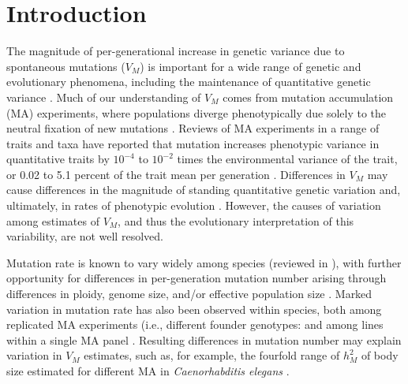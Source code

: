 \section{Introduction}
The magnitude of per-generational increase in genetic variance due to spontaneous mutations ($V_M$) is important for a wide range of genetic and evolutionary phenomena, including the maintenance of quantitative genetic variance \citep{Lync88b, Bart89, John05}. Much of our understanding of $V_M$ comes from mutation accumulation (MA) experiments, where populations diverge phenotypically due solely to the neutral fixation of new mutations \citep{Muka64,Hall09}. Reviews of MA experiments in a range of traits and taxa have reported that mutation increases phenotypic variance in quantitative traits by $10^{-4}$ to $10^{-2}$ times the environmental variance of the trait, or 0.02 to 5.1 percent of the trait mean per generation \citep{Houl96, Lync99, Hall09}. Differences in $V_M$ may cause differences in the magnitude of standing quantitative genetic variation and, ultimately, in rates of phenotypic evolution \citep{Houl98,Lync99,Houl17,Wals18}. However, the causes of variation among estimates of $V_M$, and thus the evolutionary interpretation of this variability, are not well resolved.\par

Mutation rate is known to vary widely among species (reviewed in \citealp{Katj19}), with further opportunity for differences in per-generation mutation number arising through differences in ploidy, genome size, and/or effective population size \citep{Lync99,Lync10,Sung12}. Marked variation in mutation rate has also been observed within species, both among replicated MA experiments (i.e., different founder genotypes: \citealp{Ness12,Sung12,Schr13, Ho20} and among lines within a single MA panel \citep{Huan16,Ho20}. Resulting differences in mutation number may explain variation in $V_M$ estimates, such as, for example, the fourfold range of $h_M^2$ of body size estimated for different MA in \textit{Caenorhabditis elegans} \citep{Azev02, Este05, Ostr07}.\par


